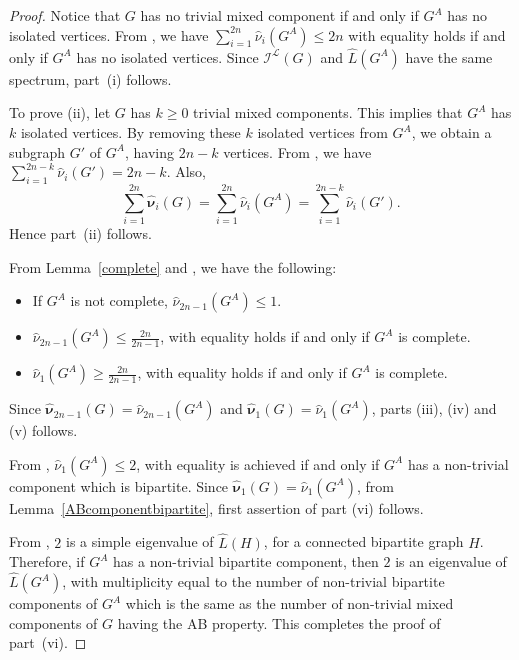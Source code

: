 \documentclass[12pt]{article}
\numberwithin{equation}{section}
\begin{document}
	\begin{proof}
		Notice that $G$ has no trivial mixed component if and only if $G^A$ has no isolated vertices. From \cite[Theorem~7.7.2(i)]{cvetkovic}, we have $\sum_{i=1}^{2n}\hat{\nu}_i(G^A)\leq2n$ with equality holds if and only if $G^A$ has no isolated vertices. Since $\mathcal{I}^\mathcal{L}(G)$ and $\widehat{L}(G^A)$ have the same spectrum, part~(i) follows. 
		
		To prove (ii), let $G$ has $k\geq 0$ trivial mixed components. This implies that $G^A$ has $k$ isolated vertices. By removing these $k$ isolated vertices from $G^A$, we obtain a subgraph $G'$ of $G^A$, having $2n-k$ vertices. From \cite[Theorem~7.7.2(i)]{cvetkovic}, we have $\sum_{i=1}^{2n-k}\hat{\nu}_i(G')=2n-k$. Also, $$\sum_{i=1}^{2n}\hat{\bm{\nu}}_i(G)=\sum_{i=1}^{2n}\hat{\nu}_i(G^A)=\sum_{i=1}^{2n-k}\hat{\nu}_i(G').$$ Hence part~(ii) follows. 
		
		From Lemma~\ref{complete} and \cite[parts (ii), (iii), (iv) of Theorem~7.7.2]{cvetkovic}, we have the following:
		\begin{itemize}
			\item  If $G^A$ is not complete, $\hat{\nu}_{2n-1}(G^A)\leq 1$.
			\item $\hat{\nu}_{2n-1}(G^A)\leq\frac{2n}{2n-1}$, with equality holds if and only if $G^A$ is complete.
			\item  $\hat{\nu}_1(G^A)\geq\frac{2n}{2n-1}$, with equality holds if and only if $G^A$ is complete. 	
		\end{itemize}
		 Since $\hat{\bm{\nu}}_{2n-1}(G)=\hat{\nu}_{2n-1}(G^A)$ and $\hat{\bm{\nu}}_{1}(G)=\hat{\nu}_{1}(G^A)$, parts (iii), (iv) and (v) follows.
		
		From \cite[Theorem~7.7.2(v)]{cvetkovic},
		$\hat{\nu}_1(G^A)\leq 2$, with equality is achieved if and only if $G^A$ has a non-trivial component which is bipartite. Since $\hat{\bm{\nu}}_1(G)=\hat{\nu}_1(G^A)$, from Lemma~\ref{ABcomponentbipartite}, first assertion of part (vi) follows. 	
		
		
		From \cite[Theorem~7.7.2(v)]{cvetkovic},  $2$ is a simple eigenvalue of $\widehat{L}(H)$, for a connected bipartite graph $H$. Therefore, if $G^A$ has a non-trivial bipartite component, then $2$ is an eigenvalue of $\widehat{L}(G^A)$, with multiplicity equal to the number of non-trivial bipartite components of $G^A$ which is the same as the number of non-trivial mixed components of $G$ having the AB property. This completes the proof of part~(vi).
	\end{proof}
	
\end{document}

